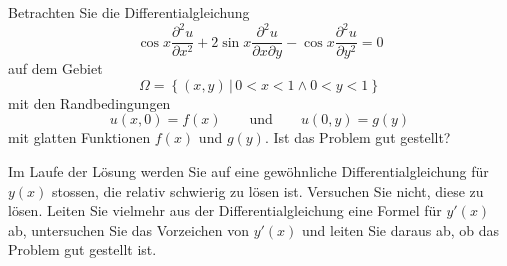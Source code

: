 Betrachten Sie die Differentialgleichung
\begin{equation}
\cos x
\frac{\partial^2 u}{\partial x^2}
+
2\sin x
\frac{\partial^2 u}{\partial x\partial y}
-
\cos x
\frac{\partial^2 u}{\partial y^2}
=
0
\label{90000016:dgl}
\end{equation}
auf dem Gebiet
\begin{equation}
\Omega
=
\left\{(x,y)\,\left|\, 0<x<1\wedge 0 <y<1\right.\right\}
\label{90000016:gebiet}
\end{equation}
mit den Randbedingungen
\[
u(x,0) = f(x)
\qquad\text{und}\qquad
u(0,y) = g(y)
\]
mit glatten Funktionen $f(x)$ und $g(y)$.
Ist das Problem gut gestellt?

\begin{hinweis}
Im Laufe der Lösung werden Sie auf eine gewöhnliche Differentialgleichung
für $y(x)$ stossen, die relativ schwierig zu lösen ist.
Versuchen Sie nicht, diese zu lösen.
Leiten Sie vielmehr aus der Differentialgleichung eine Formel für $y'(x)$ ab,
untersuchen Sie das Vorzeichen von $y'(x)$ und leiten Sie daraus ab,
ob das Problem gut gestellt ist.
\end{hinweis}

